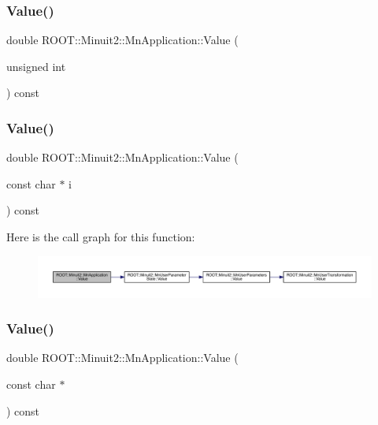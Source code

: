 \subsubsection{\texorpdfstring{Value()}{Value()}\hspace{0.1cm}{\footnotesize\ttfamily [2/4]}}
{\footnotesize\ttfamily double R\+O\+O\+T\+::\+Minuit2\+::\+Mn\+Application\+::\+Value (\begin{DoxyParamCaption}\item[{unsigned int}]{ }\end{DoxyParamCaption}) const}

\mbox{\label{classROOT_1_1Minuit2_1_1MnApplication_a0848e9b8eb22d5b23b6ba01ddcf8c135}} 
\subsubsection{\texorpdfstring{Value()}{Value()}\hspace{0.1cm}{\footnotesize\ttfamily [3/4]}}
{\footnotesize\ttfamily double R\+O\+O\+T\+::\+Minuit2\+::\+Mn\+Application\+::\+Value (\begin{DoxyParamCaption}\item[{const char $\ast$}]{i }\end{DoxyParamCaption}) const}

Here is the call graph for this function\+:\nopagebreak
\begin{figure}[H]
\begin{center}
\leavevmode
\includegraphics[width=350pt]{df/dd5/classROOT_1_1Minuit2_1_1MnApplication_a0848e9b8eb22d5b23b6ba01ddcf8c135_cgraph}
\end{center}
\end{figure}
\mbox{\label{classROOT_1_1Minuit2_1_1MnApplication_a0848e9b8eb22d5b23b6ba01ddcf8c135}} 
\subsubsection{\texorpdfstring{Value()}{Value()}\hspace{0.1cm}{\footnotesize\ttfamily [4/4]}}
{\footnotesize\ttfamily double R\+O\+O\+T\+::\+Minuit2\+::\+Mn\+Application\+::\+Value (\begin{DoxyParamCaption}\item[{const char $\ast$}]{ }\end{DoxyParamCaption}) const}

